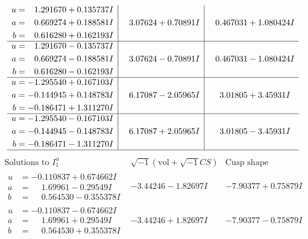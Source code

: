 \documentclass[1p]{elsarticle_modified}
\theoremstyle{definition}
\newcommand{\I}{\sqrt{-1}}
\begin{document}
$$\begin{array}{c|c|c}
\begin{aligned}
u &= \phantom{-}1.291670 + 0.135737 I \\
a &= \phantom{-}0.669274 + 0.188581 I \\
b &= \phantom{-}0.616280 + 0.162193 I\end{aligned}
 & \phantom{-}3.07624 + 0.70891 I & \phantom{-}0.467031 + 1.080424 I \\ \hline\begin{aligned}
u &= \phantom{-}1.291670 - 0.135737 I \\
a &= \phantom{-}0.669274 - 0.188581 I \\
b &= \phantom{-}0.616280 - 0.162193 I\end{aligned}
 & \phantom{-}3.07624 - 0.70891 I & \phantom{-}0.467031 - 1.080424 I \\ \hline\begin{aligned}
u &= -1.295540 + 0.167103 I \\
a &= -0.144945 + 0.148783 I \\
b &= -0.186471 + 1.311270 I\end{aligned}
 & \phantom{-}6.17087 - 2.05965 I & \phantom{-}3.01805 + 3.45931 I \\ \hline\begin{aligned}
u &= -1.295540 - 0.167103 I \\
a &= -0.144945 - 0.148783 I \\
b &= -0.186471 - 1.311270 I\end{aligned}
 & \phantom{-}6.17087 + 2.05965 I & \phantom{-}3.01805 - 3.45931 I\\
 \hline 
 \end{array}$$\newpage$$\begin{array}{c|c|c}  
\text{Solutions to }I^u_{1}& \I (\text{vol} + \sqrt{-1}CS) & \text{Cusp shape}\\
 \hline 
\begin{aligned}
u &= -0.110837 + 0.674662 I \\
a &= \phantom{-}1.69961 - 0.29549 I \\
b &= \phantom{-}0.564530 - 0.355378 I\end{aligned}
 & -3.44246 - 1.82697 I & -7.90377 + 0.75879 I \\ \hline\begin{aligned}
u &= -0.110837 - 0.674662 I \\
a &= \phantom{-}1.69961 + 0.29549 I \\
b &= \phantom{-}0.564530 + 0.355378 I\end{aligned}
 & -3.44246 + 1.82697 I & -7.90377 - 0.75879 I \\ \hline\begin{aligned}

\end{aligned}
\end{array}$$
\end{document}
